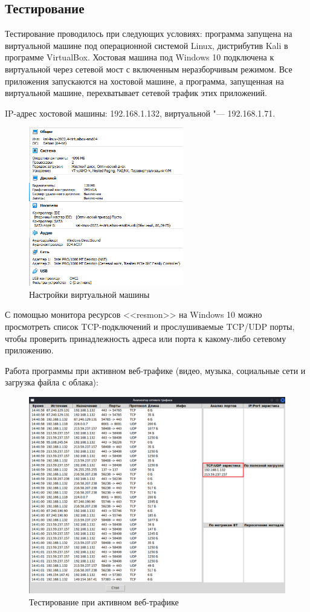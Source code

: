\documentclass[bachelor, och, coursework]{SCWorks}
\begin{document}
\subsection{Тестирование}
Тестирование проводилось при следующих условиях: программа запущена на виртуальной машине под операционной системой Linux, дистрибутив Kali в программе VirtualBox. Хостовая машина под Windows 10 подключена к виртуальной через сетевой мост с включенным неразборчивым режимом. Все приложения запускаются на хостовой машине, а программа, запущенная на виртуальной машине, перехватывает сетевой трафик этих приложений.

IP-адрес хостовой машины: 192.168.1.132, виртуальной "--- 192.168.1.71.
\begin{figure}[H]
    \centering
    \includegraphics[width=0.6\textwidth]{vbox.png}
    \caption{Настройки виртуальной машины}
\end{figure}

С помощью монитора ресурсов <<resmon>> на Windows 10 можно просмотреть список TCP-подключений и прослушиваемые TCP/UDP порты, чтобы проверить принадлежность адреса или порта к какому-либо сетевому приложению.

Работа программы при активном веб-трафике (видео, музыка, социальные сети и загрузка файла с облака):
\begin{figure}[H]
    \centering
    \includegraphics[width=1\textwidth]{test1.png}
    \caption{Тестирование при активном веб-трафике}
\end{figure}
\end{document}
